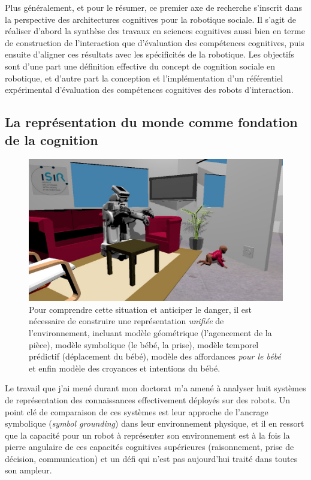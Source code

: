 \documentclass[a4paper]{article}
\begin{document}
Plus généralement, et pour le résumer, ce premier axe de recherche s'inscrit
dans la perspective des architectures cognitives pour la robotique sociale. Il
s'agit de réaliser d'abord la synthèse des travaux en sciences cognitives aussi
bien en terme de construction de l'interaction que d'évaluation des compétences
cognitives, puis ensuite d'aligner ces résultats avec les spécificités de la
robotique. Les objectifs sont d'une part une définition effective du concept de
cognition sociale en robotique, et d'autre part la conception et
l'implémentation d'un référentiel expérimental d'évaluation des compétences
cognitives des robots d'interaction.

\subsection{La représentation du monde comme fondation de la cognition}

\begin{figure}
\includegraphics[width=\textwidth]{figs/robots_home_baby_socket.jpg}
\caption{Pour comprendre cette situation et anticiper le danger, il est
    nécessaire de construire une représentation \emph{unifiée} de
    l'environnement, incluant modèle géométrique (l'agencement de la pièce), modèle
    symbolique (le bébé, la prise), modèle temporel prédictif (déplacement du
    bébé), modèle des affordances \emph{pour le bébé} et enfin modèle des
    croyances et intentions du bébé.}
\label{babyplug}
\end{figure}

Le travail que j'ai mené durant mon doctorat m'a amené à analyser huit systèmes
de représentation des connaissances effectivement déployés sur des robots. Un
point clé de comparaison de ces systèmes est leur approche de l'ancrage
symbolique (\emph{symbol grounding}) dans leur environnement physique, et il en
ressort que la capacité pour un robot à représenter son environnement est à la
fois la pierre angulaire de ces capacités cognitives supérieures (raisonnement,
prise de décision, communication) et un défi qui n'est pas aujourd'hui traité
dans toutes son ampleur.
\end{document}
